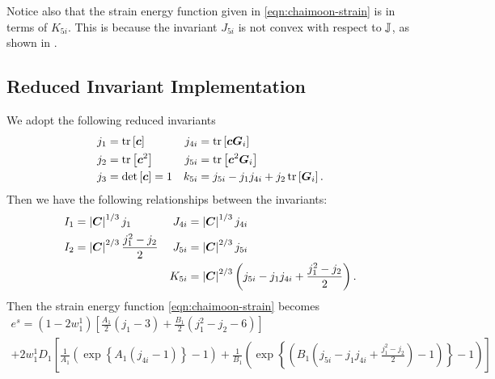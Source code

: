 \documentclass{article}
\begin{document}
\begin{remark}
   Notice also that the strain energy function given in \eqref{eqn:chaimoon-strain} is in terms of $K_{5i}$. 
   This is because the invariant $J_{5i}$ is not convex with respect to ${\mathbb J}$, as shown in \cite[Lem.~C.7]{schroder-neff-2003}.
\end{remark}

\subsection{Reduced Invariant Implementation}
We adopt the following reduced invariants
\begin{align*}
   j_1 &= \operatorname{tr}\left[{\boldsymbol c}\right] & j_{4i} &= \operatorname{tr}\left[{\boldsymbol c}{\boldsymbol G}_i\right] \\
   j_2 &= \operatorname{tr}\left[{\boldsymbol c}^2\right] & j_{5i} &= \operatorname{tr}\left[{\boldsymbol c}^2{\boldsymbol G}_i\right] \\
   j_3 &= \det\left[{\boldsymbol c}\right] = 1 & k_{5i} &= j_{5i} - j_1j_{4i} + j_2\operatorname{tr}\left[{\boldsymbol G}_i\right].   
\end{align*}
Then we have the following relationships between the invariants:
\begin{align*}
   I_1 &= \left|{\boldsymbol C}\right|^{1/3} j_1 & J_{4i} &= \left|{\boldsymbol C}\right|^{1/3} j_{4i} \\
   I_2 &= \left|{\boldsymbol C}\right|^{2/3}\frac{j_1^2 - j_2}{2} & J_{5i} &= \left|{\boldsymbol C}\right|^{2/3} j_{5i} \\
   & & K_{5i} &= \left|{\boldsymbol C}\right|^{2/3}\left(j_{5i} - j_1j_{4i} + \frac{j_1^2 - j_2}{2}\right).
\end{align*}
Then the strain energy function \eqref{eqn:chaimoon-strain} becomes 
\begin{multline}
\label{eqn:aortic-eos}
   e^s=\left(1-2 w^1_1 \right)\left[\frac{A_1}{2}\left(j_1-3\right)+\frac{B_1}{2}\left(j_1^2-j_2-6\right)\right]\\
    +2w^1_1D_1\left[\frac{1}{A_1}\left(\exp\left\{A_1\left(j_{4i}-1\right)\right\}-1\right)+\frac{1}{B_1}\left(\exp\left\{\left(B_1 \left(j_{5i}-j_1j_{4i}+\frac{j_1^2-j_2}{2}\right)-1\right)\right\}-1\right)\right]
\end{multline}
\end{document}
